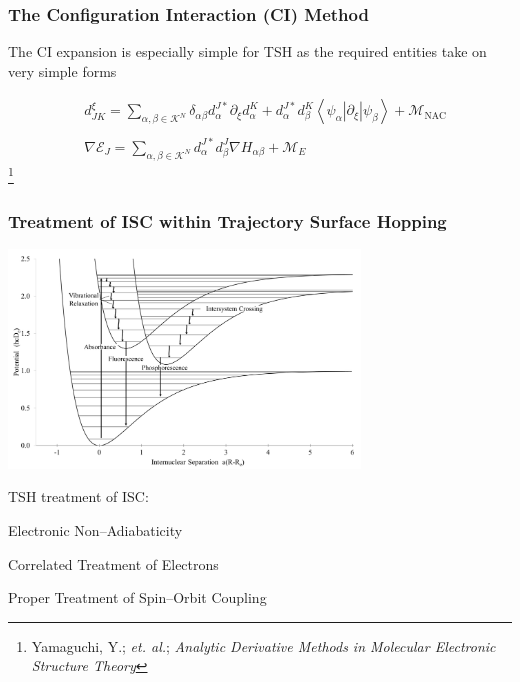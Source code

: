 \documentclass[usepdftitle=false,10pt]{beamer}
\newcommand{\cmark}{\color{green} \ding{51}}%
\newcommand{\done}{\rlap{$\square$}{\raisebox{2pt}{\large\hspace{1pt}\cmark}}%
\hspace{-2.5pt}}
\newcommand{\innerop}[3]{\left\langle #1 \left\vert #2 \right\vert #3 \right\rangle}  %
\newcommand\blfootnote[1]{%
  \begingroup
  \renewcommand\thefootnote{}\footnote{#1}%
  \addtocounter{footnote}{-1}%
  \endgroup
}
\begin{document}
\begin{frame}
  \frametitle{The Configuration Interaction (CI) Method}

  The CI expansion is especially simple for TSH as the required entities take on
  very simple forms

  \begin{align*}
    &d_{JK}^\xi = \sum_{\alpha,\beta \in \mathcal{K}^N} 
      \delta_{\alpha\beta} d_\alpha^{J*} \partial_\xi d_\alpha^K +
      d_\alpha^{J*} d_\beta^K 
      \innerop{\psi_\alpha}{\partial_\xi}{\psi_\beta} +
      \mathcal{M}_\mathrm{NAC} \\ \\
    &\nabla \mathcal{E}_J = \sum_{\alpha,\beta \in \mathcal{K}^N} 
      d_\alpha^{J*} d_\beta^J \nabla H_{\alpha\beta} +
      \mathcal{M}_E
  \end{align*}
  \blfootnote{\tiny Yamaguchi, Y.; \emph{et. al.}; \emph{Analytic Derivative Methods in Molecular Electronic Structure Theory}}
\end{frame}

\begin{frame}
  \frametitle{Treatment of ISC within Trajectory Surface Hopping}
  \begin{center}
  \includegraphics[width=0.7\textwidth]{ISC} 
  \end{center}
  \vspace{-0.5cm}
  TSH treatment of ISC: 
  \begin{mylist}
    \item[\done] Electronic Non--Adiabaticity
    \item[\done] Correlated Treatment of Electrons
    \item Proper Treatment of Spin--Orbit Coupling
  \end{mylist}
\end{frame}
\end{document}
